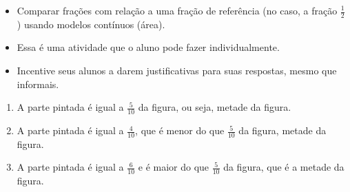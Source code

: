 \begin{atividade}\label{chap2-ativ8}
\objetivos
  \begin{itemize} %
    \item       Comparar frações com relação a uma fração de referência (no caso, a fração       $\frac{1}{2}$) usando modelos contínuos (área).
\end{itemize} %

\discussoes
  \begin{itemize} %
    \item       Essa é uma atividade que o aluno pode fazer individualmente.
    \item       Incentive seus alunos a darem justificativas para suas respostas, mesmo que informais.
\end{itemize} %

\solucao
\begin{enumerate} %
    \item A parte pintada é igual a $\frac{5}{10}$ da figura, ou seja, metade da figura.
    \item A parte pintada é igual a $\frac{4}{10}$, que é menor do que       $\frac{5}{10}$ da figura, metade da figura.
    \item  A parte pintada é igual a $\frac{6}{10}$ e é maior do que       $\frac{5}{10}$ da figura, que é a metade da figura.
\end{enumerate} %

\end{atividade}

\clearpage

